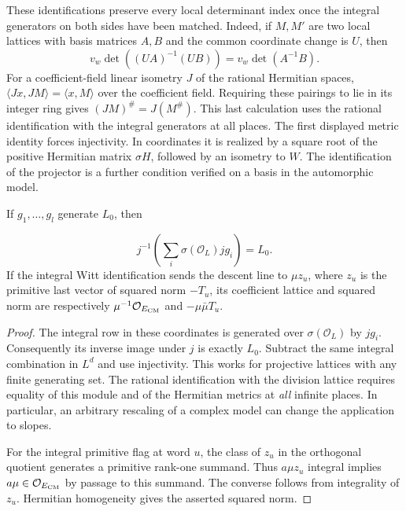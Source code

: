 These identifications preserve every local determinant index once the integral generators on both sides have been matched. Indeed, if \(M,M'\) are two local lattices with basis matrices \(A,B\) and the common coordinate change is \(U\), then
\[
 v_w\det((UA)^{-1}(UB))=v_w\det(A^{-1}B).
\]
For a coefficient-field linear isometry \(J\) of the rational Hermitian spaces, \(\langle Jx,JM\rangle=\langle x,M\rangle\) over the coefficient field. Requiring these pairings to lie in its integer ring gives \((JM)^\#=J(M^\#)\). This last calculation uses the rational identification with the integral generators at all places. The first displayed metric identity forces injectivity.
In coordinates it is realized by a square root of the positive
Hermitian matrix \(\sigma H\), followed by an isometry
to \(W\). The identification of the projector is a further
condition verified on a basis in the automorphic model.
\begin{lemma}
If \(g_1,\ldots,g_l\) generate \(L_0\), then

\[
 j^{-1}\!\left(\sum_i\sigma(\mathcal O_L)jg_i\right)=L_0.
\]
 If the integral
Witt identification sends the descent line to \(\mu z_u\), where
\(z_u\) is the primitive last vector of squared norm \(-T_u\),
its coefficient lattice and squared norm are respectively
\(\mu^{-1}\mathcal O_{E_{\rm CM}}\) and \(-\mu\bar\mu T_u\).
\end{lemma}
\begin{proof}
The integral row in these coordinates is generated over \(\sigma(\mathcal O_L)\)
by \(jg_i\). Consequently its inverse image under \(j\) is
exactly \(L_0\). Subtract the same integral combination in
\(L^d\) and use injectivity. This works for projective
lattices with any finite generating set. The rational
identification with the division lattice requires equality of
this module and of the Hermitian metrics at \emph{all} infinite
places. In particular, an arbitrary rescaling of a complex
model can change the application to slopes.

For the integral primitive flag at word \(u\), the class of \(z_u\)
in the orthogonal quotient generates a primitive rank-one summand.
Thus \(a\mu z_u\) integral implies \(a\mu\in\mathcal O_{E_{\rm CM}}\)
by passage to this summand. The converse follows from integrality
of \(z_u\). Hermitian homogeneity gives the asserted squared norm.
\end{proof}

